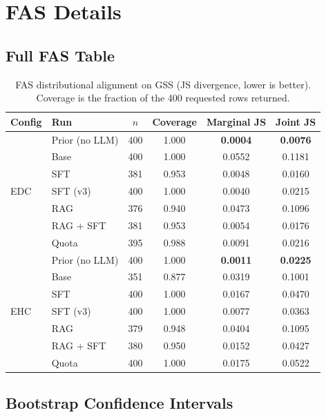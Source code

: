 \chapter{FAS Details}
\label{app:fas}

\section{Full FAS Table}

\begin{table}[h]
\centering
\small
\caption{FAS distributional alignment on GSS (JS divergence, lower is better).
Coverage is the fraction of the 400 requested rows returned.}
\label{tab:fas_full}
\begin{tabular}{llcccc}
\toprule
Config & Run & $n$ & Coverage & Marginal JS & Joint JS \\
\midrule
\multirow{7}{*}{EDC} & Prior (no LLM) & 400 & 1.000 & \textbf{0.0004} & \textbf{0.0076} \\
 & Base & 400 & 1.000 & 0.0552 & 0.1181 \\
 & SFT & 381 & 0.953 & 0.0048 & 0.0160 \\
 & SFT (v3) & 400 & 1.000 & 0.0040 & 0.0215 \\
 & RAG & 376 & 0.940 & 0.0473 & 0.1096 \\
 & RAG + SFT & 381 & 0.953 & 0.0054 & 0.0176 \\
 & Quota & 395 & 0.988 & 0.0091 & 0.0216 \\
\midrule
\multirow{7}{*}{EHC} & Prior (no LLM) & 400 & 1.000 & \textbf{0.0011} & \textbf{0.0225} \\
 & Base & 351 & 0.877 & 0.0319 & 0.1001 \\
 & SFT & 400 & 1.000 & 0.0167 & 0.0470 \\
 & SFT (v3) & 400 & 1.000 & 0.0077 & 0.0363 \\
 & RAG & 379 & 0.948 & 0.0404 & 0.1095 \\
 & RAG + SFT & 380 & 0.950 & 0.0152 & 0.0427 \\
 & Quota & 400 & 1.000 & 0.0175 & 0.0522 \\
\bottomrule
\end{tabular}
\end{table}

\section{Bootstrap Confidence Intervals}

